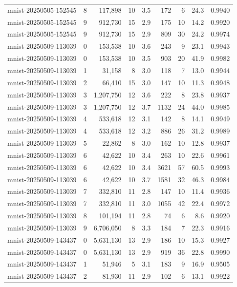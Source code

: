 \begin{tabular}{llrrrrrrr}
mnist-20250505-152545 & 8 & 117,898 & 10 & 3.5 & 172 & 6 & 24.3 & 0.9940 \\
mnist-20250505-152545 & 9 & 912,730 & 15 & 2.9 & 175 & 10 & 14.2 & 0.9920 \\
mnist-20250505-152545 & 9 & 912,730 & 15 & 2.9 & 809 & 30 & 24.2 & 0.9974 \\
mnist-20250509-113039 & 0 & 153,538 & 10 & 3.6 & 243 & 9 & 23.1 & 0.9943 \\
mnist-20250509-113039 & 0 & 153,538 & 10 & 3.5 & 903 & 20 & 41.9 & 0.9982 \\
mnist-20250509-113039 & 1 & 31,158 & 8 & 3.0 & 118 & 7 & 13.0 & 0.9944 \\
mnist-20250509-113039 & 2 & 66,410 & 15 & 3.0 & 147 & 10 & 11.3 & 0.9948 \\
mnist-20250509-113039 & 3 & 1,207,750 & 12 & 3.6 & 222 & 8 & 23.8 & 0.9937 \\
mnist-20250509-113039 & 3 & 1,207,750 & 12 & 3.7 & 1132 & 24 & 44.0 & 0.9985 \\
mnist-20250509-113039 & 4 & 533,618 & 12 & 3.1 & 142 & 8 & 14.1 & 0.9949 \\
mnist-20250509-113039 & 4 & 533,618 & 12 & 3.2 & 886 & 26 & 31.2 & 0.9989 \\
mnist-20250509-113039 & 5 & 22,862 & 8 & 3.0 & 162 & 10 & 12.8 & 0.9937 \\
mnist-20250509-113039 & 6 & 42,622 & 10 & 3.4 & 263 & 10 & 22.6 & 0.9961 \\
mnist-20250509-113039 & 6 & 42,622 & 10 & 3.4 & 3621 & 57 & 60.5 & 0.9993 \\
mnist-20250509-113039 & 6 & 42,622 & 10 & 3.7 & 1581 & 32 & 46.3 & 0.9984 \\
mnist-20250509-113039 & 7 & 332,810 & 11 & 2.8 & 147 & 10 & 11.4 & 0.9936 \\
mnist-20250509-113039 & 7 & 332,810 & 11 & 3.0 & 1055 & 42 & 22.4 & 0.9972 \\
mnist-20250509-113039 & 8 & 101,194 & 11 & 2.8 & 74 & 6 & 8.6 & 0.9920 \\
mnist-20250509-113039 & 9 & 6,706,050 & 8 & 3.3 & 184 & 7 & 22.3 & 0.9916 \\
mnist-20250509-143437 & 0 & 5,631,130 & 13 & 2.9 & 186 & 10 & 15.3 & 0.9927 \\
mnist-20250509-143437 & 0 & 5,631,130 & 13 & 2.9 & 919 & 36 & 22.8 & 0.9990 \\
mnist-20250509-143437 & 1 & 51,946 & 5 & 3.1 & 183 & 9 & 16.9 & 0.9505 \\
mnist-20250509-143437 & 2 & 81,930 & 11 & 2.9 & 102 & 6 & 13.1 & 0.9922 \\

\end{tabular}
